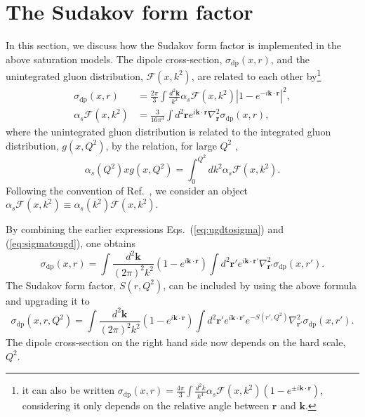 \documentclass[11pt]{article}
\newcommand{\pairdot}[2]{ \mathbf{#1}\cdot\mathbf{#2}  }
\begin{document}

\section{The Sudakov form factor }
In this section, we discuss how the Sudakov form factor is implemented in the above saturation models. %
The dipole cross-section, $\sigma_{\mathrm{dp}}(x, r) $, and the unintegrated gluon distribution, $\mathcal{F}(x,k^2)$, are related to each other by\footnote{it can also be written $\sigma_{\mathrm{dp}}(x,r) = \frac{4 \pi}{3} \int\frac{d^2 k}{k^4} \alpha_s \mathcal{F}(x, k^2) \left(1-e^{\pm i \pairdot{k}{r}}\right) $, considering it only depends on the relative angle between $\mathbf{r}$ and $\mathbf{k}$.}
\cite{bgk2002}
\begin{align} 
\sigma_{\mathrm{dp}}(x,r) &= \frac{2 \pi}{3} \int\frac{d^2 \mathbf{k} }{k^2} \alpha_s \mathcal{F}(x, k^2) |1-e^{-i \pairdot{k}{r}}|^2,
\label{eq:ugdtosigma}\\
\alpha_s \mathcal{F}(x,k^2) &= \frac{3 }{16 \pi^3}\int d^2 \mathbf{r} e^{i \pairdot{k}{r}}  \nabla^2_{\mathbf{r}} \sigma_{\mathrm{dp}}(x,r),
\label{eq:sigmatougd}
\end{align}
where the unintegrated gluon distribution is related to the integrated gluon distribution, $g(x,Q^2)$, by the relation, for large $Q^2$ \cite{bgk2002},%
\begin{equation}
\alpha_s(Q^2) x g(x,Q^2)=\int^{Q^2}_{0} d k^2 \alpha_s \mathcal{F}(x,k^2).
\end{equation}
Following the convention of Ref.~\cite{bgk2002}, we consider an object $\alpha_s\mathcal{F}(x,k^2)\equiv\alpha_s(k^2)\mathcal{F}(x,k^2)$.

By combining the earlier expressions Eqs.~(\ref{eq:ugdtosigma}) and (\ref{eq:sigmatougd}), one obtains
\begin{equation}
\sigma_{\mathrm{dp}}(x,r) =\int \frac{d^2 \mathbf{k}}{(2\pi)^2k^2}\left( 1- e^{i \pairdot{k}{r}}\right) \int d^2 \mathbf{{r'} } e^{i\pairdot{k}{{r'} }}\nabla^2_{\mathbf{{r'} }}\sigma_{\mathrm{dp}}(x,{r'} ).
\label{eq:dptodp}
\end{equation}
The Sudakov form factor, $S(r,Q^2)$, can be included by using the above formula and upgrading it to
\cite{xiao2017}
\begin{equation}
\sigma_{\mathrm{dp}}(x,r,Q^2) =\int \frac{d^2 \mathbf{k}}{(2\pi)^2 k^2} \left( 1- e^{i \pairdot{k}{r}}\right) \int d^2 \mathbf{ {r'} } e^{i\pairdot{k}{{r'} }}e^{-S({r'} ,Q^2)} \nabla^2_{\mathbf{{r'} }}\sigma_{\mathrm{dp}}(x,{r'} ).
\end{equation}
The dipole cross-section on the right hand side now depends on the hard scale, $Q^2$.
\end{document}
